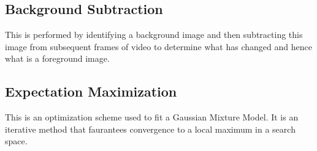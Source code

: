 \subsection{Background Subtraction}

This is performed by identifying a background image and then subtracting this image from subsequent frames of video to determine what has changed and hence what is a foreground image.

\subsection{Expectation Maximization}

This is an optimization scheme used to fit a Gaussian Mixture Model. It is an iterative method that faurantees convergence to a local maximum in a search space.